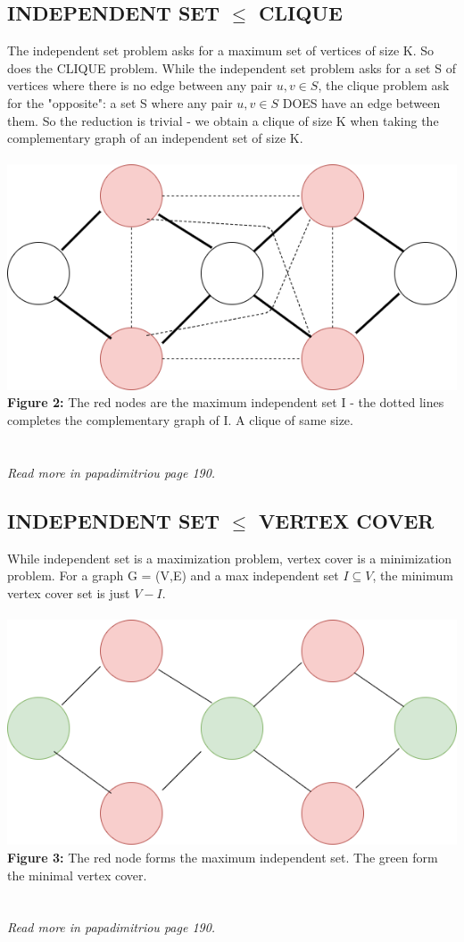 \subsection{INDEPENDENT SET $\le$ CLIQUE}
The independent set problem asks for a maximum set of vertices of size K. So does the CLIQUE problem. While the independent set problem asks for a set S of vertices where there is no edge between any pair $u,v \in S$, the clique problem ask for the "opposite": a set S where any pair $u,v \in S$ DOES have an edge between them. So the reduction is trivial - we obtain a clique of size K when taking the complementary graph of an independent set of size K.\\\\
\includegraphics[scale=0.5]{IStoCLIQ}\\
\textbf{Figure 2:} The red nodes are the maximum independent set I - the dotted lines completes the complementary graph of I. A clique of same size.
\\\\\\
\textit{Read more in papadimitriou page 190.}
\newpage
\subsection{INDEPENDENT SET $\le$ VERTEX COVER}
While independent set is a maximization problem, vertex cover is a minimization problem. For a graph G = (V,E) and a max independent set $I \subseteq V$, the minimum vertex cover set is just $V-I$.\\\\
\includegraphics[scale=0.5]{IStoCOVER}\\
\textbf{Figure 3:} The red node forms the maximum independent set. The green form the minimal vertex cover.
\\\\\\
\textit{Read more in papadimitriou page 190.}
\newpage
